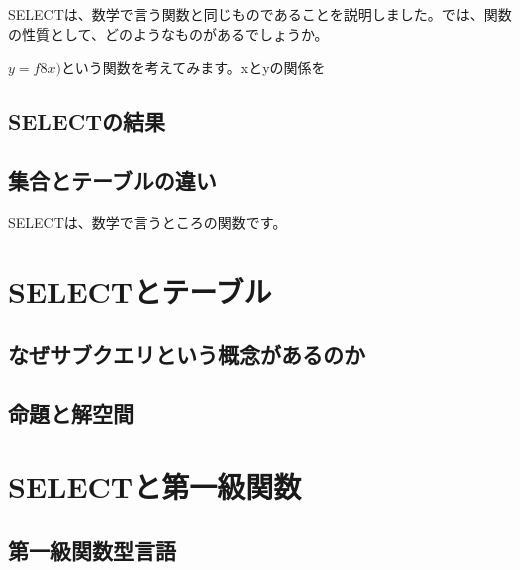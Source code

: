 SELECTは、数学で言う関数と同じものであることを説明しました。では、関数の性質として、どのようなものがあるでしょうか。

$y=f8x)$という関数を考えてみます。xとyの関係を

\subsection{SELECTの結果}

\subsection{集合とテーブルの違い}

SELECTは、数学で言うところの関数です。

\section{SELECTとテーブル}

\subsection{なぜサブクエリという概念があるのか}

\subsection{命題と解空間}

\section{SELECTと第一級関数}


\subsection{第一級関数型言語}